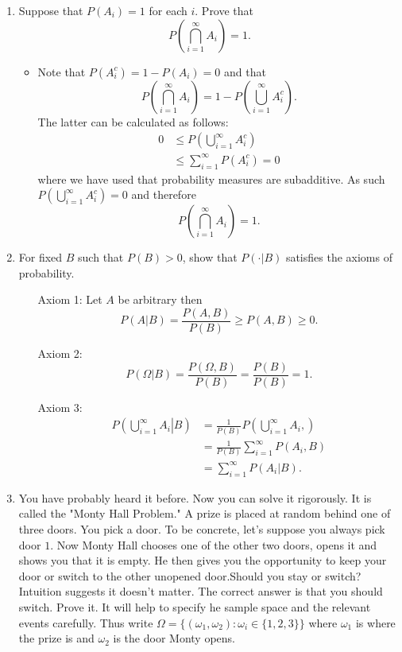 \documentclass{article}
\begin{document}
\begin{enumerate}
\begin{itemize}
	\end{itemize}
	\item Suppose that $P(A_i) = 1$ for each $i$. Prove that
	$$
	P\left( \bigcap_{i = 1}^\infty A_i \right) = 1.
	$$
		\begin{itemize}
			\item Note that $P(A_i^c) = 1 - P(A_i) = 0$ and that
			$$
			P\left( \bigcap_{i = 1}^\infty A_i \right) = 1 - P\left( \bigcup_{i = 1}^\infty A_i^c \right).
			$$
			The latter can be calculated as follows:
			$$
			\begin{aligned}
			0 &\leq P\left( \bigcup_{i = 1}^\infty A_i^c \right) \\
			&\leq \sum_{i = 1}^\infty P(A_i^c) = 0
			\end{aligned}
			$$
			where we have used that probability measures are subadditive. As such $P\left( \bigcup_{i = 1}^\infty A_i^c \right) = 0$ and therefore
			$$
			P\left( \bigcap_{i = 1}^\infty A_i \right) = 1.
			$$
		\end{itemize}
	\item For fixed $B$ such that $P(B) > 0$, show that $P(\cdot|B)$ satisfies the axioms of probability.
		\begin{itemize}
			\item[Axiom 1:] Let $A$ be arbitrary then
			$$
			P(A|B) = \frac{P(A, B)}{P(B)} \geq P(A, B) \geq 0.
			$$
			\item[Axiom 2:] $$P(\Omega|B) = \frac{P(\Omega, B)}{P(B)} = \frac{P(B)}{P(B)} = 1.$$
			\item[Axiom 3:]
			$$
			\begin{aligned}
			P\left(\left.\bigcup_{i = 1}^\infty A_i \right| B\right) &= \frac{1}{P(B)} P\left(\bigcup_{i = 1}^\infty A_i, \right) \\
			&= \frac{1}{P(B)} \sum_{i = 1}^\infty P(A_i, B) \\
			&= \sum_{i = 1}^\infty P(A_i|B).
			\end{aligned}
			$$
		\end{itemize}
	\item You have probably heard it before. Now you can solve it rigorously. It is called the "Monty Hall Problem." A prize is placed at random behind one of three doors. You pick a door. To be concrete, let's suppose you always pick door $1$. Now Monty Hall chooses one of the other two doors, opens it and shows you that it is empty. He then gives you the opportunity to keep your door or switch to the other unopened door.Should you stay or switch? Intuition suggests it doesn't matter. The correct answer is that you should switch. Prove it. It will help to specify he sample space and the relevant events carefully. Thus write $\Omega = \{(\omega_1, \omega_2): \omega_i \in \{1,2,3\}\}$ where $\omega_1$ is where the prize is and $\omega_2$ is the door Monty opens.

\end{enumerate}
\end{document}
